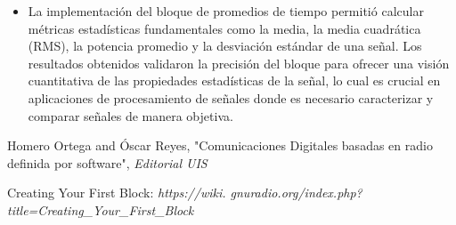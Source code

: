 \documentclass{journal}[IEEEtran, twocolumn]             %
\begin{document}
\begin{multicols}{2}
\begin{itemize}
    \item La implementación del bloque de promedios de tiempo permitió calcular métricas estadísticas fundamentales como la media, la media cuadrática (RMS), la potencia promedio y la desviación estándar de una señal. Los resultados obtenidos validaron la precisión del bloque para ofrecer una visión cuantitativa de las propiedades estadísticas de la señal, lo cual es crucial en aplicaciones de procesamiento de señales donde es necesario caracterizar y comparar señales de manera objetiva.
    
\end{itemize}

\begin{thebibliography}{1}

Homero Ortega and Óscar Reyes, "Comunicaciones Digitales basadas en radio definida por software", \textit{Editorial UIS}

Creating Your First Block:  \textit{https://wiki.
gnuradio.org/index.php?title=Creating_Your_First_Block}

\end{thebibliography}

\end{multicols}
\end{document}
